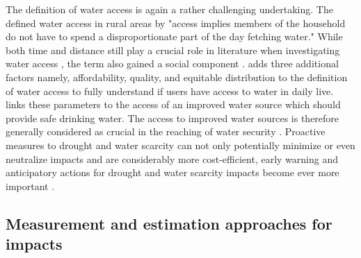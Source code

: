 The definition of water access is again a rather challenging undertaking. The \autocite[254]{worldbankWorldDevelopmentReport1997} defined water access in rural areas by "access implies members of the household do not have to spend a disproportionate part of the day fetching water." While both time and distance still play a crucial role in literature when investigating water access \autocite{cassiviDrinkingWaterAccessibility2019,cassiviEvaluatingSelfreportedMeasures2021,emenikeAccessingSafeDrinking2017}, the term also gained a social component \autocite{emenikeAccessingSafeDrinking2017,mitlinUnaffordableUndrinkable}. \autocite{obeng-odoomAccessWater2012} adds three additional factors namely, affordability, quality, and equitable distribution to the definition of water access to fully understand if users have access to water in daily live. \autocite{unitednations/developmentprogrammeDeepeningDemocracyFragmented2002} links these parameters to the access of an improved water source which should provide safe drinking water. The access to improved water sources is therefore generally considered as crucial in the reaching of water security \autocite{cdcAssessingAccessWater2022}.\newline 
Proactive measures to drought and water scarcity can not only potentially minimize or even neutralize impacts and are considerably more cost-efficient, early warning and anticipatory actions for drought and water scarcity impacts become ever more important \autocite{faoandun-waterProgressLevelWater2021,idmpDroughtWaterScarcity2022,worldbankHighDryClimate2016}.


\subsection{Measurement and estimation approaches for impacts}\label{subsec:indicators} %

